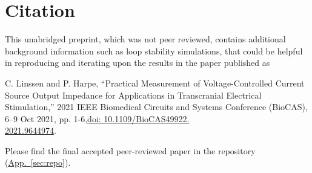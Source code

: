 \documentclass[10pt]{article}
\newcommand{\briefappxlink}[1]{\hyperref[#1]{App.~\ref*{#1}}}
\begin{document}
\section{Citation}

This unabridged preprint, which was \colorbox{yellow!30}{not peer reviewed}, contains additional background information such as loop stability simulations, that could be helpful in reproducing and iterating upon the results in the paper published as\\[.5em]

\noindent
\begin{changemargin}{2em}{2em}
C. Linssen and P. Harpe, ``Practical Measurement of Voltage-Controlled Current Source Output Impedance for Applications in Transcranial Electrical Stimulation,'' 2021 IEEE Biomedical Circuits and Systems Conference (BioCAS), 6--9 Oct 2021, pp. 1-6,\href{https://doi.org/10.1109/BioCAS49922.2021.9644974}{doi: 10.1109/BioCAS49922.\\2021.9644974}.
\end{changemargin}

\noindent Please find the final accepted peer-reviewed paper in the repository (\briefappxlink{sec:repo}).



\renewcommand{\bibfont}{\small}
\setlength{\bibsep}{0mm}



\end{document}
